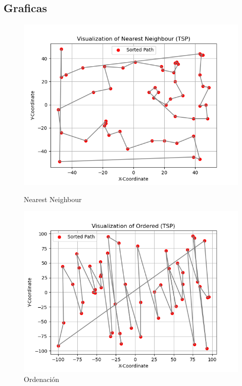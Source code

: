 \documentclass[11pt,openany]{book}
\begin{document}
\subsection{Graficas}
\begin{figure}[H]
      \centering
      \begin{minipage}{.48\textwidth}
            \centering
            \includegraphics[width=1.1\linewidth]{assets/Img/NearestVisual.png}
            \caption{Nearest Neighbour}
            \label{fig:nearest}
      \end{minipage}%
      \begin{minipage}{.48\textwidth}
            \centering
            \includegraphics[width=1.1\linewidth]{assets/Img/OrdVisual.png}
            \caption{Ordenación}
            \label{fig:ordered}
      \end{minipage}
\end{figure}
\end{document}
